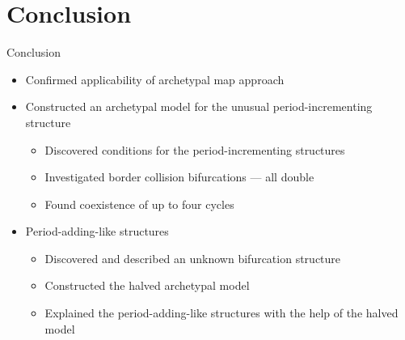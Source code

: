 \section{Conclusion}

\begin{frame}{Conclusion}
	\begin{itemize}
		\item Confirmed applicability of archetypal map approach
		      \pause
		\item Constructed an archetypal model for the unusual period-incrementing structure
		      \begin{itemize}
			      \item Discovered conditions for the period-incrementing structures
			      \item Investigated border collision bifurcations --- all double
			      \item Found coexistence of up to four cycles
		      \end{itemize}
		      \pause
		\item Period-adding-like structures
		      \begin{itemize}
			      \item Discovered and described an unknown bifurcation structure
			      \item Constructed the halved archetypal model
			      \item Explained the period-adding-like structures with the help of the halved model
		      \end{itemize}
	\end{itemize}
\end{frame}
